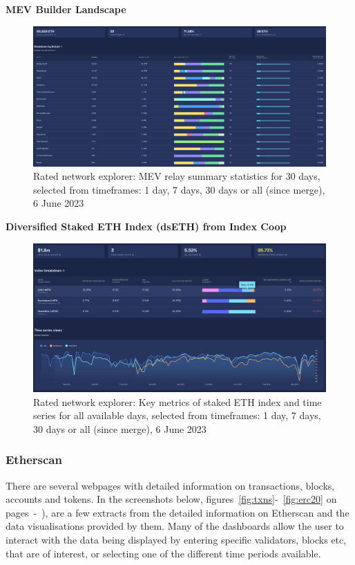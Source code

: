\documentclass[UTF8]{article}
\begin{document}
\clearpage
\textbf{MEV Builder Landscape}
\begin{figure}[htbp]
\begin{center}
\includegraphics[width=\linewidth]{images/ratedbuilder}
\caption{Rated network explorer: MEV relay summary statistics for 30 days, selected from timeframes: 1 day, 7 days, 30 days or all (since merge), 6 June 2023}
\label{fig:ratedbuilder}
\end{center}
\end{figure}

\textbf{Diversified Staked ETH Index (dsETH) from Index Coop}
\begin{figure}[htbp]
\begin{center}
\includegraphics[width=0.9\linewidth]{images/ratedcoop}
\caption{Rated network explorer: Key metrics of staked ETH index and time series for all available days, selected from timeframes: 1 day, 7 days, 30 days or all (since merge), 6 June 2023}
\label{fig:ratedcoop}
\end{center}
\end{figure}


\clearpage
\subsubsection*{Etherscan}
There are several webpages with detailed information on transactions, blocks, accounts and tokens. In the screenshots below, figures~\ref{fig:txns}-~\ref{fig:erc20} on pages~\pageref{fig:txns}-~\pageref{fig:erc20}), are a few extracts from the detailed information on Etherscan and the data visualisations provided by them. Many of the dashboards allow the user to interact with the data being displayed by entering specific validators, blocks etc, that are of interest, or selecting one of the different time periods available. 
\end{document}
